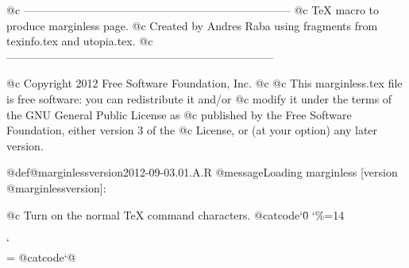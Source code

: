 @c ------------------------------------------------------------------------
@c TeX macro to produce marginless page. 
@c Created by Andres Raba using fragments from texinfo.tex and utopia.tex.
@c ------------------------------------------------------------------------
  
@c Copyright 2012 Free Software Foundation, Inc.
@c
@c This marginless.tex file is free software: you can redistribute it and/or
@c modify it under the terms of the GNU General Public License as
@c published by the Free Software Foundation, either version 3 of the
@c License, or (at your option) any later version.

@def@marginlessversion{2012-09-03.01.A.R}
@message{Loading marginless [version @marginlessversion]:}

@c Turn on the normal TeX command characters.
@catcode`\=0
\catcode`\%=14

\def\pocket{{\globaldefs = 1
  \parskip = 2pt plus 1pt
  \textleading = 21.3pt		%

  \internalpagesizes{7.92in}{5.8in}%
                    {-0.87in}{-0.81in}%
                    {0pt}{0pt}%
                    {8.24in}{6.18in}%
  
  \lispnarrowing = 0.3in
  \tolerance = 700
  \hfuzz = 1pt
  \contentsrightmargin = 0pt
  \defbodyindent = .5cm
}}

\catcode`\\=\active
@catcode`@%


